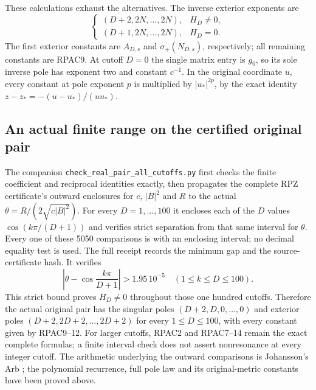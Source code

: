 \documentclass[11pt]{article}
\begin{document}
These calculations exhaust the alternatives. The inverse exterior
exponents are
\[
 \begin{cases}
 (D+2,2N,\ldots,2N),&H_D\ne0,\\
 (D+1,2N,\ldots,2N),&H_D=0.
 \end{cases}
\]
The first exterior constants are
$A_{D,s}$ and $\sigma_+(N_{D,s})$, respectively; all remaining
constants are RPAC9. At cutoff $D=0$ the single matrix entry is
$g_0$, so its sole inverse pole has exponent two and constant
$c^{-1}$. In the original coordinate $u$, every constant at pole
exponent $p$ is multiplied by $|u_*|^{2p}$, by the exact identity
$z-z_*=-(u-u_*)/(uu_*)$.

\subsection{An actual finite range on the certified original pair}
The companion \nolinkurl{check_real_pair_all_cutoffs.py} first
checks the finite coefficient and reciprocal identities exactly,
then propagates the complete RPZ certificate's outward enclosures
for $c$, $|B|^2$ and $R$ to the actual
$\theta=R/(2\sqrt{c|B|^2})$. For every $D=1,\ldots,100$ it
encloses each of the $D$ values $\cos(k\pi/(D+1))$ and verifies
strict separation from that same interval for $\theta$.
Every one of these 5050 comparisons is with an enclosing interval;
no decimal equality test is used. The full receipt records the
minimum gap and the source-certificate hash. It verifies
\[
 \left|\theta-\cos\frac{k\pi}{D+1}\right|>1.95\,10^{-5}
 \quad(1\le k\le D\le100).\tag{RPAC15}
\]
This strict bound proves $H_D\ne0$ throughout those one hundred
cutoffs. Therefore the actual original pair has the singular poles
$(D+2,D,0,\ldots,0)$ and exterior poles
$(D+2,2D+2,\ldots,2D+2)$ for every $1\le D\le100$,
with every constant given by RPAC9--12. For larger cutoffs,
RPAC2 and RPAC7--14 remain the exact complete formulas; a finite
interval check does not assert nonresonance at every integer cutoff.
The arithmetic underlying the outward comparisons is Johansson's
Arb \cite{human:arb2016}; the polynomial recurrence, full pole law
and its original-metric constants have been proved above.

\clearpage
\end{document}
